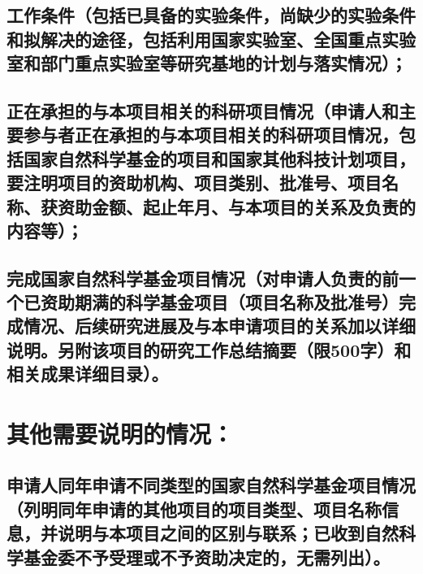 \documentclass[UTF8, punct, oneside, fontset=none]{ctexbook}
\begin{document}
\begin{MS}
	
\end{MS}

\section[f]{\textbf{工作条件}（包括已具备的实验条件，尚缺少的实验条件和拟解决的途径，包括利用国家实验室、全国重点实验室和部门重点实验室等研究基地的计划与落实情况）；}

\begin{MS}
	
\end{MS}

\section[f]{\textbf{正在承担的与本项目相关的科研项目情况}（申请人和主要参与者正在承担的与本项目相关的科研项目情况，包括国家自然科学基金的项目和国家其他科技计划项目，要注明项目的资助机构、项目类别、批准号、项目名称、获资助金额、起止年月、与本项目的关系及负责的内容等）；}

\begin{MS}
	
\end{MS}


\section[f]{\textbf{完成国家自然科学基金项目情况}（对申请人负责的前一个已资助期满的科学基金项目（项目名称及批准号）完成情况、后续研究进展及与本申请项目的关系加以详细说明。另附该项目的研究工作总结摘要（限500字）和相关成果详细目录）。}

\begin{MS}
	
\end{MS}

\chapter{\textbf{其他需要说明的情况：}}
\section{申请人同年申请不同类型的国家自然科学基金项目情况（列明同年申请的其他项目的项目类型、项目名称信息，并说明与本项目之间的区别与联系；已收到自然科学基金委不予受理或不予资助决定的，无需列出）。}

\begin{MS}
	
\end{MS}
\end{document}
